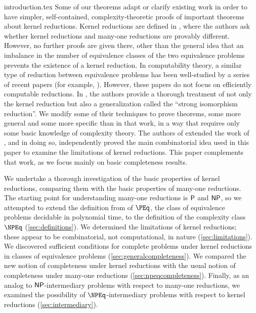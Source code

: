 \begin{filecontents}{introduction.tex}
Some of our theorems adapt or clarify existing work in order to have simpler, self-contained, complexity-theoretic proofs of important theorems about kernel reductions.
Kernel reductions are defined in \cite{fg11}, where the authors ask whether kernel reductions and many-one reductions are provably different.
However, no further proofs are given there, other than the general idea that an imbalance in the number of equivalence classes of the two equivalence problems prevents the existence of a kernel reduction.
In computability theory, a similar type of reduction between equivalence problems has been well-studied by a series of recent papers (for example, \cite{gg01, ff12, ffn12, chm12, imnn13, almnss14, mn14}).
However, these papers do not focus on efficiently computable reductions.
In \cite{bcffm}, the authors provide a thorough treatment of not only the kernel reduction but also a generalization called the ``strong isomorphism reduction''.
We modify some of their techniques to prove theorems, some more general and some more specific than in that work, in a way that requires only some basic knowledge of complexity theory.
The authors of \cite{gz14} extended the work of \cite{bcffm}, and in doing so, independently proved the main combinatorial idea used in this paper to examine the limitations of kernel reductions.
This paper complements that work, as we focus mainly on basic completeness results.

We undertake a thorough investigation of the basic properties of kernel reductions, comparing them with the basic properties of many-one reductions.
The starting point for understanding many-one reductions is $\P$ and $\NP$, so we attempted to extend the definition from \cite{fg11} of $\PEq$, the class of equivalence problems decidable in polynomial time, to the definition of the complexity class $\NPEq$ (\ref{sec:definitions}).
We determined the limitations of kernel reductions; these appear to be combinatorial, not computational, in nature (\ref{sec:limitations}).
We discovered sufficient conditions for complete problems under kernel reductions in classes of equivalence problems (\ref{sec:generalcompleteness}).
We compared the new notion of completeness under kernel reductions with the usual notion of completeness under many-one reductions (\ref{sec:npeqcompleteness}).
Finally, as an analog to $\NP$-intermediary problems with respect to many-one reductions, we examined the possibility of $\NPEq$-intermediary problems with respect to kernel reductions (\ref{sec:intermediary}).
\end{filecontents}
